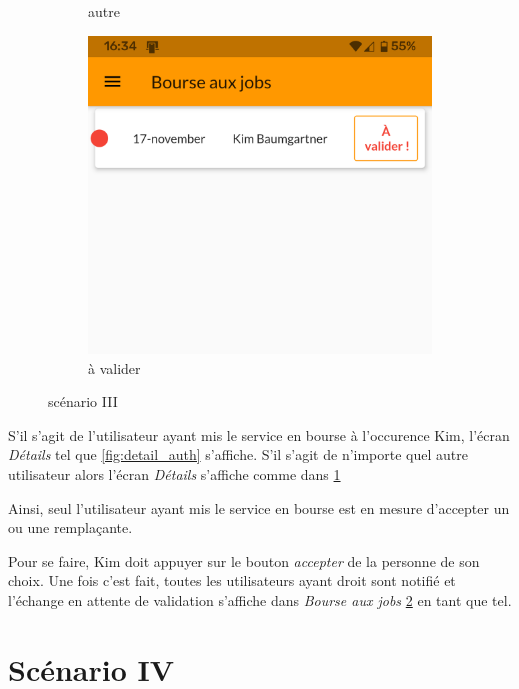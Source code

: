 \begin{figure}[!h]
\begin{subfigure}{.3\textwidth}
            \caption{autre}
            \label{fig:detail_non_auth}
        \end{subfigure}
        \begin{subfigure}{.3\textwidth}
            \centering
            \includegraphics[width=0.9\linewidth]{screenshots/scenario_03/a_valider.png}
            \caption{à valider}
            \label{fig:a_valider}
        \end{subfigure}
        \caption{scénario III}
        \label{fig:scen03}
    \end{figure}

    S'il s'agit de l'utilisateur ayant mis le service en bourse à l'occurence Kim, l'écran \textit{Détails} tel que \ref{fig:detail_auth} s'affiche.
    S'il s'agit de n'importe quel autre utilisateur alors l'écran \textit{Détails} s'affiche comme dans \ref{fig:detail_non_auth}

    Ainsi, seul l'utilisateur ayant mis le service en bourse est en mesure d'accepter un ou une remplaçante. 
    
    Pour se faire, Kim doit appuyer sur le bouton \textit{accepter} de la personne de son choix. Une fois c'est fait, toutes les utilisateurs ayant droit sont notifié
    et l'échange en attente de validation s'affiche dans \textit{Bourse aux jobs} \ref{fig:a_valider} en tant que tel.

\section[Valider un échange - Scénario IV]{Scénario IV}

